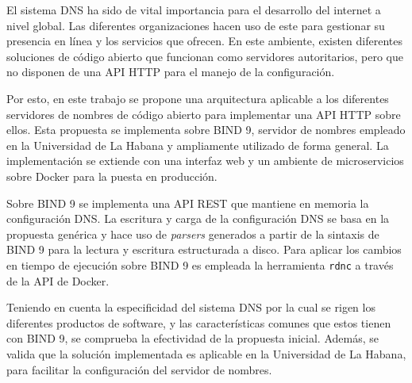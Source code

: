 \begin{resumen}
El sistema DNS ha sido de vital importancia para el desarrollo del internet a nivel global. Las diferentes organizaciones hacen uso de este para gestionar su presencia en línea y los servicios que ofrecen. En este ambiente, existen diferentes soluciones de código abierto que funcionan como servidores autoritarios, pero que no disponen de una API HTTP para el manejo de la configuración.

Por esto, en este trabajo se propone una arquitectura aplicable a los diferentes servidores de nombres de código abierto para implementar una API HTTP sobre ellos. Esta propuesta se implementa sobre BIND 9, servidor de nombres empleado en la Universidad de La Habana y ampliamente utilizado de forma general. La implementación se extiende con una interfaz web y un ambiente de microservicios sobre Docker para la puesta en producción.

Sobre BIND 9 se implementa una API REST que mantiene en memoria la configuración DNS. La escritura y carga de la configuración DNS se basa en la propuesta genérica y hace uso de \textit{parsers} generados a partir de la sintaxis de BIND 9 para la lectura y escritura estructurada a disco. Para aplicar los cambios en tiempo de ejecución sobre BIND 9 es empleada la herramienta \verb|rdnc| a través de la API de Docker.

Teniendo en cuenta la especificidad del sistema DNS por la cual se rigen los diferentes productos de software, y las características comunes que estos tienen con BIND 9, se comprueba la efectividad de la propuesta inicial. Además, se valida que la solución implementada es aplicable en la Universidad de La Habana, para facilitar la configuración del servidor de nombres.
\end{resumen}

